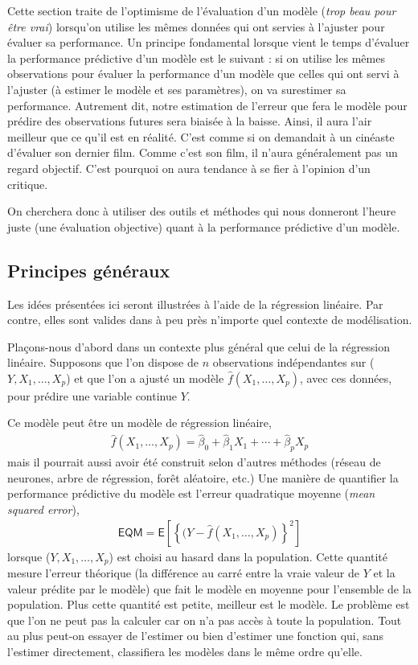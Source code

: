 \documentclass[
  11pt,
  letterpaper,
]{scrbook}
\theoremstyle{definition}
\theoremstyle{remark}
\begin{document}
Cette section traite de l'optimisme de l'évaluation d'un modèle
(\emph{trop beau pour être vrai}) lorsqu'on utilise les mêmes données
qui ont servies à l'ajuster pour évaluer sa performance. Un principe
fondamental lorsque vient le temps d'évaluer la performance prédictive
d'un modèle est le suivant : si on utilise les mêmes observations pour
évaluer la performance d'un modèle que celles qui ont servi à l'ajuster
(à estimer le modèle et ses paramètres), on va surestimer sa
performance. Autrement dit, notre estimation de l'erreur que fera le
modèle pour prédire des observations futures sera biaisée à la baisse.
Ainsi, il aura l'air meilleur que ce qu'il est en réalité. C'est comme
si on demandait à un cinéaste d'évaluer son dernier film. Comme c'est
son film, il n'aura généralement pas un regard objectif. C'est pourquoi
on aura tendance à se fier à l'opinion d'un critique.

On cherchera donc à utiliser des outils et méthodes qui nous donneront
l'heure juste (une évaluation objective) quant à la performance
prédictive d'un modèle.

\hypertarget{principes-guxe9nuxe9raux}{%
\subsection{Principes généraux}\label{principes-guxe9nuxe9raux}}

Les idées présentées ici seront illustrées à l'aide de la régression
linéaire. Par contre, elles sont valides dans à peu près n'importe quel
contexte de modélisation.

Plaçons-nous d'abord dans un contexte plus général que celui de la
régression linéaire. Supposons que l'on dispose de \(n\) observations
indépendantes sur (\(Y, X_1, \ldots, X_p\)) et que l'on a ajusté un
modèle \(\widehat{f}(X_1, \ldots, X_p)\), avec ces données, pour prédire
une variable continue \(Y\).

Ce modèle peut être un modèle de régression linéaire, \begin{align*}
\widehat{f}(X_1, \ldots, X_p) = \widehat{\beta}_0 + \widehat{\beta}_1X_1 + \cdots + \widehat{\beta}_pX_p
\end{align*} mais il pourrait aussi avoir été construit selon d'autres
méthodes (réseau de neurones, arbre de régression, forêt aléatoire,
etc.) Une manière de quantifier la performance prédictive du modèle est
l'erreur quadratique moyenne (\emph{mean squared error}), \begin{align*}
\mathsf{EQM}=\mathsf{E}\left[\left\{(Y-\widehat{f}(X_1, \ldots, X_p)\right\}^2\right]
\end{align*} lorsque (\(Y, X_1, \ldots, X_p\)) est choisi au hasard dans
la population. Cette quantité mesure l'erreur théorique (la différence
au carré entre la vraie valeur de \(Y\) et la valeur prédite par le
modèle) que fait le modèle en moyenne pour l'ensemble de la population.
Plus cette quantité est petite, meilleur est le modèle. Le problème est
que l'on ne peut pas la calculer car on n'a pas accès à toute la
population. Tout au plus peut-on essayer de l'estimer ou bien d'estimer
une fonction qui, sans l'estimer directement, classifiera les modèles
dans le même ordre qu'elle.
\end{document}
